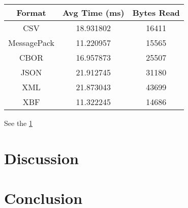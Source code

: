 \documentclass[conference]{IEEEtran}
\begin{document}
\begin{table}[htbp]
	\begin{center}
		\begin{tabular}{|c|c|c|}
			\hline
			\textbf{Format} & \textbf{Avg Time (ms)} & \textbf{Bytes Read} \\
			\hline
			CSV             & 18.931802              & 16411               \\
			MessagePack     & 11.220957              & 15565               \\
			CBOR            & 16.957873              & 25507               \\
			JSON            & 21.912745              & 31180               \\
			XML             & 21.873043              & 43699               \\
			XBF             & 11.322245              & 14686               \\
			\hline
		\end{tabular}
		\label{results}
	\end{center}
\end{table}

See the \ref{results}

\section{Discussion}

\section{Conclusion}



\end{document}
